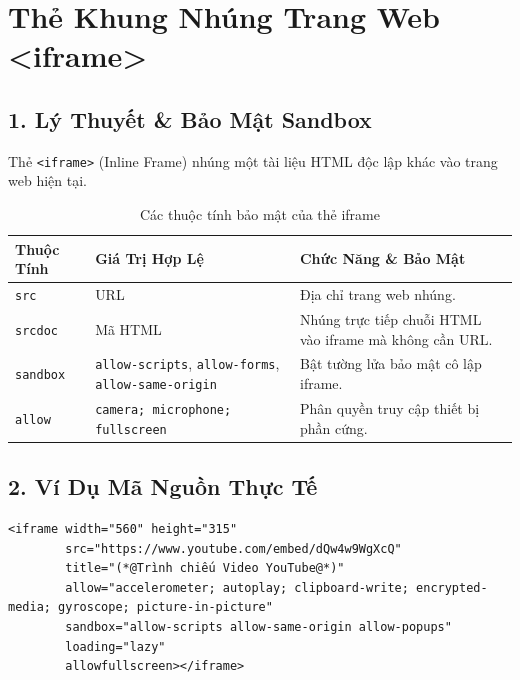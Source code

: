 \documentclass[11pt,oneside]{book}
\newcommand{\codeinline}[1]{\textcolor{accentOrange}{\texttt{#1}}}
\begin{document}
\section{Thẻ Khung Nhúng Trang Web <iframe>}
\subsection{1. Lý Thuyết \& Bảo Mật Sandbox}
Thẻ \codeinline{<iframe>} (Inline Frame) nhúng một tài liệu HTML độc lập khác vào trang web hiện tại.

\begin{table}[H]
\centering
\begin{prettyTableBox}
\small
{}
\begin{tabularx}{\linewidth}{lp{3.5cm}X}
\rowcolor{primaryBlue}
\color{white}\textbf{Thuộc Tính} & \color{white}\textbf{Giá Trị Hợp Lệ} & \color{white}\textbf{Chức Năng \& Bảo Mật} \\
\hline
\codeinline{src} & URL & Địa chỉ trang web nhúng. \\
\codeinline{srcdoc} & Mã HTML & Nhúng trực tiếp chuỗi HTML vào iframe mà không cần URL. \\
\codeinline{sandbox} & \codeinline{allow-scripts}, \codeinline{allow-forms}, \codeinline{allow-same-origin} & Bật tường lửa bảo mật cô lập iframe. \\
\codeinline{allow} & \codeinline{camera; microphone; fullscreen} & Phân quyền truy cập thiết bị phần cứng. \\
\end{tabularx}
\end{prettyTableBox}
\vspace{-2pt}
\caption{Các thuộc tính bảo mật của thẻ iframe}
\end{table}

\subsection{2. Ví Dụ Mã Nguồn Thực Tế}
\begin{lstlisting}[language=HTML5, caption={Ví dụ nhúng video YouTube an toàn với sandbox và allow}]
<iframe width="560" height="315"
        src="https://www.youtube.com/embed/dQw4w9WgXcQ"
        title="(*@Trình chiếu Video YouTube@*)"
        allow="accelerometer; autoplay; clipboard-write; encrypted-media; gyroscope; picture-in-picture"
        sandbox="allow-scripts allow-same-origin allow-popups"
        loading="lazy"
        allowfullscreen></iframe>
\end{lstlisting}
\end{document}
